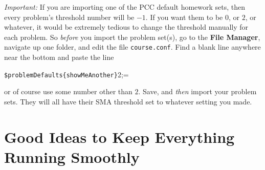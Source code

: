 \documentclass[12pt]{article}
\newcommand{\menu}[1]{\textbf{#1}}
\newcommand{\FM}{\menu{File Manager}}
\begin{document}
\emph{Important:}
If you are importing one of the PCC default homework sets, then every problem's threshold number will be $-1$.
If you want them to be $0$, or $2$, or whatever, it would be extremely tedious to change the threshold manually for each problem.
So \emph{before} you import the problem set(s), go to the \FM, navigate up one folder, and edit the file \texttt{course.conf}.
Find a blank line anywhere near the bottom and paste the line \begin{center} \verb=$problemDefaults{showMeAnother}=2;= \end{center} or of course use some number other than $2$.
Save, and \emph{then} import your problem sets.
They will all have their SMA threshold set to whatever setting you made.

\section{Good Ideas to Keep Everything Running Smoothly}\label{goodideas}
\end{document}
